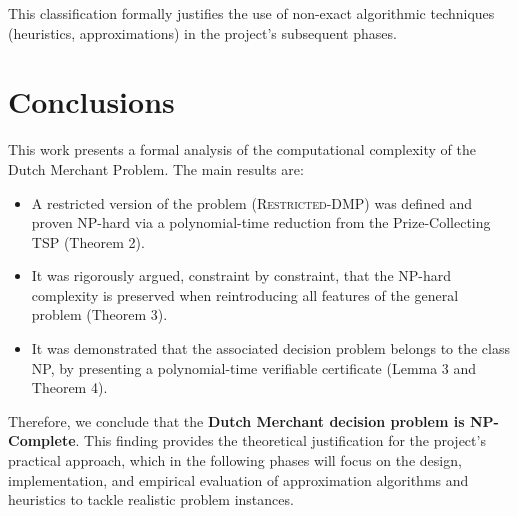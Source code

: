 \documentclass{article} \usepackage[english]{babel} \usepackage[utf8]{inputenc}
\begin{document}
This classification formally justifies the use of non-exact algorithmic
techniques (heuristics, approximations) in the project's subsequent phases.

\section{Conclusions} \label{sec:conclusions}

This work presents a formal analysis of the computational complexity of the
Dutch Merchant Problem. The main results are: \begin{itemize} \item A restricted
version of the problem (\textsc{Restricted-DMP}) was defined and proven NP-hard
via a polynomial-time reduction from the Prize-Collecting TSP (Theorem 2). \item
It was rigorously argued, constraint by constraint, that the NP-hard complexity
is preserved when reintroducing all features of the general problem (Theorem 3).
\item It was demonstrated that the associated decision problem belongs to the
class NP, by presenting a polynomial-time verifiable certificate (Lemma 3 and
Theorem 4). \end{itemize} Therefore, we conclude that the \textbf{Dutch Merchant
decision problem is NP-Complete}. This finding provides the theoretical
justification for the project's practical approach, which in the following
phases will focus on the design, implementation, and empirical evaluation of
approximation algorithms and heuristics to tackle realistic problem instances.

 
\end{document}
